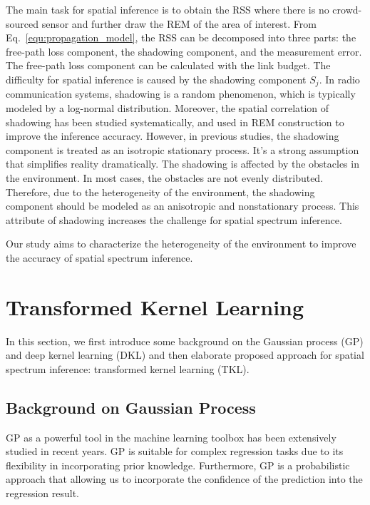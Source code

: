 \documentclass[journal, oneside, twocolumn]{IEEEtran}
\begin{document}
The main task for spatial inference is to obtain the RSS where there is no crowd-sourced sensor and further draw the REM of the area of interest. From Eq.~\eqref{equ:propagation_model}, the RSS can be decomposed into three parts: the free-path loss component, the shadowing component, and the measurement error. The free-path loss component can be calculated with the link budget. The difficulty for spatial inference is caused by the shadowing component $S_j$\cite{Xu2021}. In radio communication systems, shadowing is a random phenomenon, which is typically modeled by a log-normal distribution\cite{Cho2010}. Moreover, the spatial correlation of shadowing has been studied systematically\cite{Agrawal2009, Gudmundson1991}, and used in REM construction to improve the inference accuracy\cite{Han2019, Sato2017, Xu2021}. However, in previous studies, the shadowing component is treated as an isotropic stationary process. It's a strong assumption that simplifies reality dramatically. The shadowing is affected by the obstacles in the environment. In most cases, the obstacles are not evenly distributed. Therefore, due to the heterogeneity of the environment, the shadowing component should be modeled as an anisotropic and nonstationary process. This attribute of shadowing increases the challenge for spatial spectrum inference. 

Our study aims to characterize the heterogeneity of the environment to improve the accuracy of spatial spectrum inference.

\section{Transformed Kernel Learning}

In this section, we first introduce some background on the Gaussian process (GP) and deep kernel learning (DKL) and then elaborate proposed approach for spatial spectrum inference: transformed kernel learning (TKL).

\subsection{Background on Gaussian Process}
GP as a powerful tool in the machine learning toolbox \cite{Rasmussen2006} has been extensively studied in recent years\cite{Damianou2013, Wilson2013,Duvenaud2014a,Salimbeni2017a, Lee2018,Wilson2019}. GP is suitable for complex regression tasks due to its flexibility in incorporating prior knowledge. Furthermore, GP is a probabilistic approach that allowing us to incorporate the confidence of the prediction into the regression result.
\end{document}
